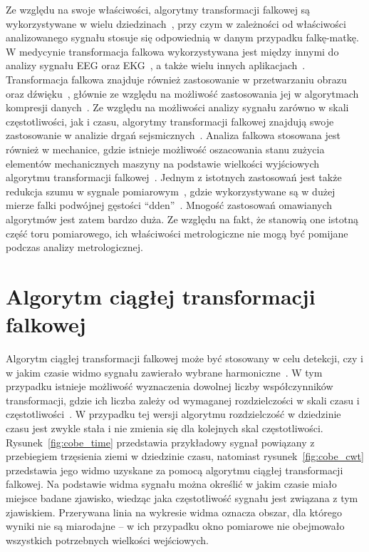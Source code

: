 Ze względu na swoje właściwości, algorytmy transformacji falkowej są wykorzystywane w wielu dziedzinach~\cite{akujuobi_applications}, przy czym w zależności od właściwości analizowanego sygnału stosuje się odpowiednią w danym przypadku falkę-matkę. W medycynie transformacja falkowa wykorzystywana jest między innymi do analizy sygnału EEG oraz EKG~\cite{ocak_medicine}, a także wielu innych aplikacjach~\cite{unser_medicine}. Transformacja falkowa znajduje również zastosowanie w przetwarzaniu obrazu oraz dźwięku~\cite{kotteri_imagecomp}, głównie ze względu na możliwość zastosowania jej w algorytmach kompresji danych~\cite{reddy_compression}. Ze względu na możliwości analizy sygnału zarówno w skali częstotliwości, jak i czasu, algorytmy transformacji falkowej znajdują swoje zastosowanie w analizie drgań sejsmicznych~\cite{anping_seismic}. Analiza falkowa stosowana jest również w mechanice, gdzie istnieje możliwość oszacowania stanu zużycia elementów mechanicznych maszyny na podstawie wielkości wyjściowych algorytmu transformacji falkowej~\cite{yan_mechanics}. Jednym z istotnych zastosowań jest także redukcja szumu w sygnale pomiarowym~\cite{auth_denoise}, gdzie wykorzystywane są w dużej mierze falki podwójnej gęstości \enquote{dden}~\cite{vimala_ddendenoise}. Mnogość zastosowań omawianych algorytmów jest zatem bardzo duża. Ze względu na fakt, że stanowią one istotną część toru pomiarowego, ich właściwości metrologiczne nie mogą być pomijane podczas analizy metrologicznej.

\section{Algorytm ciągłej transformacji falkowej}

Algorytm ciągłej transformacji falkowej może być stosowany w celu detekcji, czy i w jakim czasie widmo sygnału zawierało wybrane harmoniczne~\cite{anping_seismic}. W tym przypadku istnieje możliwość wyznaczenia dowolnej liczby współczynników transformacji, gdzie ich liczba zależy od wymaganej rozdzielczości w skali czasu i częstotliwości~\cite{wallen_handbook}. W przypadku tej wersji algorytmu rozdzielczość w dziedzinie czasu jest zwykle stała i nie zmienia się dla kolejnych skal częstotliwości. Rysunek~\ref{fig:cobe_time} przedstawia przykładowy sygnał powiązany z przebiegiem trzęsienia ziemi w dziedzinie czasu, natomiast rysunek~\ref{fig:cobe_cwt} przedstawia jego widmo uzyskane za pomocą algorytmu ciągłej transformacji falkowej. Na podstawie widma sygnału można określić w jakim czasie miało miejsce badane zjawisko, wiedząc jaka częstotliwość sygnału jest związana z tym zjawiskiem. Przerywana linia na wykresie widma oznacza obszar, dla którego wyniki nie są miarodajne -- w ich przypadku okno pomiarowe nie obejmowało wszystkich potrzebnych wielkości wejściowych.

